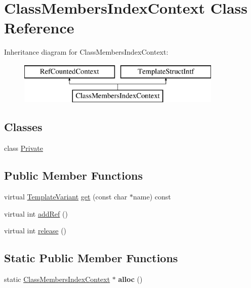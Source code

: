 \hypertarget{class_class_members_index_context}{}\section{Class\+Members\+Index\+Context Class Reference}
\label{class_class_members_index_context}
Inheritance diagram for Class\+Members\+Index\+Context\+:\begin{figure}[H]
\begin{center}
\leavevmode
\includegraphics[height=2.000000cm]{class_class_members_index_context}
\end{center}
\end{figure}
\subsection*{Classes}
\begin{DoxyCompactItemize}
\item 
class \mbox{\hyperlink{class_class_members_index_context_1_1_private}{Private}}
\end{DoxyCompactItemize}
\subsection*{Public Member Functions}
\begin{DoxyCompactItemize}
\item 
virtual \mbox{\hyperlink{class_template_variant}{Template\+Variant}} \mbox{\hyperlink{class_class_members_index_context_a87447001049b9491690e4b8e04f7851f}{get}} (const char $\ast$name) const
\item 
virtual int \mbox{\hyperlink{class_class_members_index_context_aee2107e3b581e26c374a76b102672a2e}{add\+Ref}} ()
\item 
virtual int \mbox{\hyperlink{class_class_members_index_context_a8605031254937e99bc7874e0715ea7f2}{release}} ()
\end{DoxyCompactItemize}
\subsection*{Static Public Member Functions}
\begin{DoxyCompactItemize}
\item 
\mbox{\label{class_class_members_index_context_af80e5590d7c947eb2f9c8ee0c1e1fdd9}} 
static \mbox{\hyperlink{class_class_members_index_context}{Class\+Members\+Index\+Context}} $\ast$ {\bfseries alloc} ()
\end{DoxyCompactItemize}


